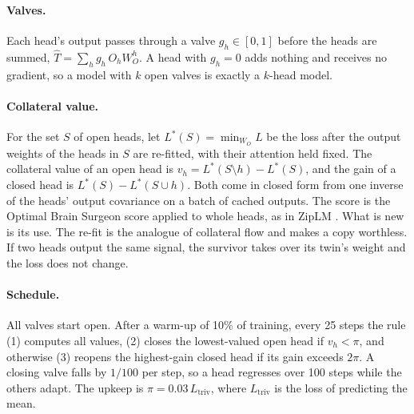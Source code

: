 \documentclass[letterpaper]{article} %
\newcommand{\Ltriv}{L_{\mathrm{triv}}}
\begin{document}
\paragraph{Valves.} Each head's output passes through a valve $g_h\in[0,1]$ before the heads are summed, $\hat{T}=\sum_h g_h\, O_h W_O^h$. A head with $g_h=0$ adds nothing and receives no gradient, so a model with $k$ open valves is exactly a $k$-head model.

\paragraph{Collateral value.} For the set $S$ of open heads, let $L^\ast(S)=\min_{W_O} L$ be the loss after the output weights of the heads in $S$ are re-fitted, with their attention held fixed. The collateral value of an open head is $v_h=L^\ast(S\setminus h)-L^\ast(S)$, and the gain of a closed head is $L^\ast(S)-L^\ast(S\cup h)$. Both come in closed form from one inverse of the heads' output covariance on a batch of cached outputs. The score is the Optimal Brain Surgeon score \citep{obs} applied to whole heads, as in ZipLM \citep{ziplm}. What is new is its use. The re-fit is the analogue of collateral flow and makes a copy worthless. If two heads output the same signal, the survivor takes over its twin's weight and the loss does not change.

\paragraph{Schedule.} All valves start open. After a warm-up of 10\% of training, every 25 steps the rule (1) computes all values, (2) closes the lowest-valued open head if $v_h<\pi$, and otherwise (3) reopens the highest-gain closed head if its gain exceeds $2\pi$. A closing valve falls by $1/100$ per step, so a head regresses over 100 steps while the others adapt. The upkeep is $\pi=0.03\,\Ltriv$, where $\Ltriv$ is the loss of predicting the mean.
\end{document}
